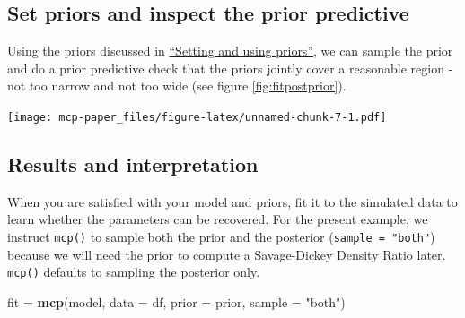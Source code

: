 \documentclass[
  american,
]{article}
\newenvironment{Shaded}{\begin{snugshade}}{\end{snugshade}}
\newcommand{\CommentTok}[1]{\textcolor[rgb]{0.56,0.35,0.01}{\textit{#1}}}
\newcommand{\DataTypeTok}[1]{\textcolor[rgb]{0.13,0.29,0.53}{#1}}
\newcommand{\KeywordTok}[1]{\textcolor[rgb]{0.13,0.29,0.53}{\textbf{#1}}}
\newcommand{\NormalTok}[1]{#1}
\newcommand{\OperatorTok}[1]{\textcolor[rgb]{0.81,0.36,0.00}{\textbf{#1}}}
\newcommand{\StringTok}[1]{\textcolor[rgb]{0.31,0.60,0.02}{#1}}
\begin{document}
\hypertarget{set-priors-and-inspect-the-prior-predictive}{%
\subsection{Set priors and inspect the prior predictive}\label{set-priors-and-inspect-the-prior-predictive}}

Using the priors discussed in \protect\hyperlink{priors_api}{``Setting and using priors''}, we can sample the prior and do a prior predictive check that the priors jointly cover a reasonable region - not too narrow and not too wide \citep{conn2018} (see figure \ref{fig:fitpostprior}).

\begin{Shaded}
\end{Shaded}

\texttt{[image: mcp-paper\_files/figure-latex/unnamed-chunk-7-1.pdf]}

\hypertarget{results-and-interpretation}{%
\subsection{Results and interpretation}\label{results-and-interpretation}}

When you are satisfied with your model and priors, fit it to the simulated data to learn whether the parameters can be recovered. For the present example, we instruct \texttt{mcp()} to sample both the prior and the posterior (\texttt{sample\ =\ "both"}) because we will need the prior to compute a Savage-Dickey Density Ratio later. \texttt{mcp()} defaults to sampling the posterior only.

\begin{Shaded}
\begin{Highlighting}[]
\NormalTok{fit =}\StringTok{ }\KeywordTok{mcp}\NormalTok{(model, }\DataTypeTok{data =}\NormalTok{ df, }\DataTypeTok{prior =}\NormalTok{ prior, }\DataTypeTok{sample =} \StringTok{"both"}\NormalTok{)}
\end{Highlighting}
\end{Shaded}
\end{document}
